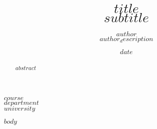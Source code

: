\documentclass[12pt]{article}
\title{\textbf{\LARGE $title$}\\[0.5em] %
      \large $subtitle$} %
\author{$author$ \\ $author_description$}
\date{$date$}
\begin{document}
\maketitle

\begin{center}
  $course$ \\
  $department$ \\
  $university$ \\
\end{center}

\begin{abstract}
$abstract$
\end{abstract}

\newpage

$body$ %

\printbibliography[heading=bibintoc, title={References}] %
\end{document}
